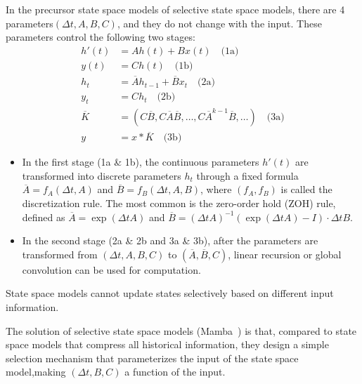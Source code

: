 \documentclass{article}
\theoremstyle{plain}
\theoremstyle{definition}
\theoremstyle{remark}
\begin{document}
In the precursor state space models of selective state space models, there are 4 parameters$(\Delta t, A, B, C)$, and they do not change with the input. These parameters control the following two stages:
\begin{align}
   h'(t) &= Ah(t) + Bx(t) \quad \text{(1a)} \nonumber \\
   y(t) &= Ch(t) \quad \text{(1b)} \nonumber \\
   h_t &= \overline{A}h_{t-1} + \overline{B}x_t \quad \text{(2a)} \nonumber \\
   y_t &= Ch_t \quad \text{(2b)} \nonumber \\
   \overline{K} &= (C\overline{B}, C\overline{A}\overline{B}, \ldots, C\overline{A}^{k-1}\overline{B}, \ldots) \quad \text{(3a)} \nonumber \\
   y &= x * \overline{K} \quad \text{(3b)} \nonumber
\end{align}
\begin{itemize}
   \item In the first stage (1a \& 1b), the continuous parameters $h'(t)$ are transformed into discrete parameters $h_t$ through a fixed formula $\overline{A} = f_A(\Delta t, A)$ and $\overline{B} = f_B(\Delta t, A, B)$, where $(f_A, f_B)$ is called the discretization rule. The most common is the zero-order hold (ZOH) rule, defined as $\overline{A} = \exp(\Delta t A)$ and $\overline{B} = (\Delta t A)^{-1} (\exp(\Delta t A) - I) \cdot \Delta t B$.
   \item In the second stage (2a \& 2b and 3a \& 3b), after the parameters are transformed from $(\Delta t, A, B, C)$ to $(\overline{A}, \overline{B}, C)$, linear recursion or global convolution can be used for computation.
\end{itemize}
State space models cannot update states selectively based on different input information.

The solution of selective state space models (Mamba~\citep{gu2023mamba}) is that, compared to state space models that compress all historical information, they design a simple selection mechanism that parameterizes the input of the state space model,making $(\Delta t, B, C)$  a function of the input.
\end{document}
